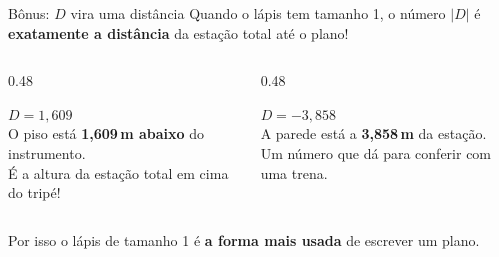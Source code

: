 \documentclass[aspectratio=169,11pt]{beamer}
\newcommand{\bnum}[1]{\textbf{\textcolor{mTeal}{#1}}}
\begin{document}
\begin{frame}{Bônus: $D$ vira uma distância}
  Quando o lápis tem tamanho 1, o número $|D|$ é \bnum{exatamente a distância}
  da estação total até o plano!
  \bigskip
  \begin{columns}[T]
    \begin{column}{0.48\textwidth}
      \begin{ideia}[title={Piso}]
        $D = 1{,}609$\\[3pt]
        O piso está \bnum{1,609\,m abaixo} do instrumento.\\[3pt]
        {\small É a altura da estação total em cima do tripé!}
      \end{ideia}
    \end{column}
    \begin{column}{0.48\textwidth}
      \begin{ideia}[title={Parede}]
        $D = -3{,}858$\\[3pt]
        A parede está a \bnum{3,858\,m} da estação.\\[3pt]
        {\small Um número que dá para conferir com uma trena.}
      \end{ideia}
    \end{column}
  \end{columns}
  \bigskip
  Por isso o lápis de tamanho 1 é \bnum{a forma mais usada} de escrever um plano.
\end{frame}
\end{document}
